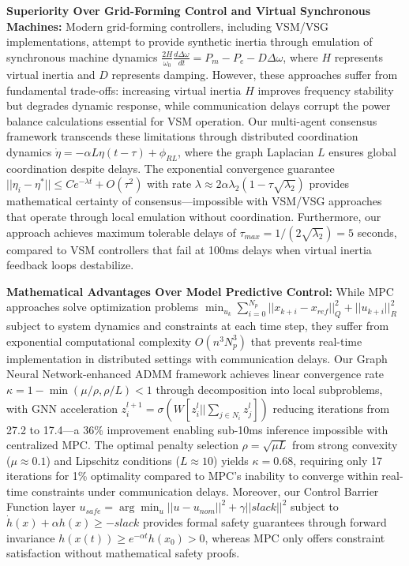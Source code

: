 \documentclass[12pt]{article}
\begin{document}
\textbf{Superiority Over Grid-Forming Control and Virtual Synchronous Machines:} Modern grid-forming controllers, including VSM/VSG implementations, attempt to provide synthetic inertia through emulation of synchronous machine dynamics $\frac{2H}{\omega_0}\frac{d\Delta\omega}{dt} = P_m - P_e - D\Delta\omega$, where $H$ represents virtual inertia and $D$ represents damping. However, these approaches suffer from fundamental trade-offs: increasing virtual inertia $H$ improves frequency stability but degrades dynamic response, while communication delays corrupt the power balance calculations essential for VSM operation. Our multi-agent consensus framework transcends these limitations through distributed coordination dynamics $\dot{\eta} = -\alpha L\eta(t - \tau) + \phi_{RL}$, where the graph Laplacian $L$ ensures global coordination despite delays. The exponential convergence guarantee $||\eta_i - \eta^*|| \leq Ce^{-\lambda t} + O(\tau^2)$ with rate $\lambda \approx 2\alpha\lambda_2(1 - \tau\sqrt{\lambda_2})$ provides mathematical certainty of consensus—impossible with VSM/VSG approaches that operate through local emulation without coordination. Furthermore, our approach achieves maximum tolerable delays of $\tau_{max} = 1/(2\sqrt{\lambda_2}) = 5$ seconds, compared to VSM controllers that fail at 100ms delays when virtual inertia feedback loops destabilize.

\textbf{Mathematical Advantages Over Model Predictive Control:} While MPC approaches solve optimization problems $\min_{u_k} \sum_{i=0}^{N_p} ||x_{k+i} - x_{ref}||^2_Q + ||u_{k+i}||^2_R$ subject to system dynamics and constraints at each time step, they suffer from exponential computational complexity $O(n^3 N_p^3)$ that prevents real-time implementation in distributed settings with communication delays. Our Graph Neural Network-enhanced ADMM framework achieves linear convergence rate $\kappa = 1 - \min(\mu/\rho, \rho/L) < 1$ through decomposition into local subproblems, with GNN acceleration $z^{l+1}_i = \sigma(W[z^l_i || \sum_{j \in N_i} z^l_j])$ reducing iterations from 27.2 to 17.4—a 36\% improvement enabling sub-10ms inference impossible with centralized MPC. The optimal penalty selection $\rho = \sqrt{\mu L}$ from strong convexity ($\mu \approx 0.1$) and Lipschitz conditions ($L \approx 10$) yields $\kappa = 0.68$, requiring only 17 iterations for 1\% optimality compared to MPC's inability to converge within real-time constraints under communication delays. Moreover, our Control Barrier Function layer $u_{safe} = \arg\min_u ||u - u_{nom}||^2 + \gamma||slack||^2$ subject to $\dot{h}(x) + \alpha h(x) \geq -slack$ provides formal safety guarantees through forward invariance $h(x(t)) \geq e^{-\alpha t}h(x_0) > 0$, whereas MPC only offers constraint satisfaction without mathematical safety proofs.
\end{document}
